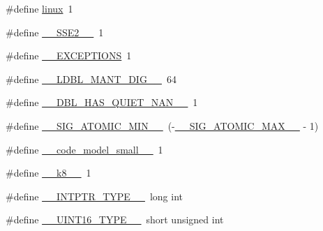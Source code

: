 \begin{DoxyCompactItemize}
\item 
\#define \hyperlink{build-analizer__host-_desktop___qt__5__9__0___g_c_c__64bit-_release_2moc__predefs_8h_aa092b0d4c1d4d4407b97024f6cb2820c}{linux}~1
\item 
\#define \hyperlink{build-analizer__host-_desktop___qt__5__9__0___g_c_c__64bit-_release_2moc__predefs_8h_a88cd3f961f8705563745c43024377efa}{\+\_\+\+\_\+\+S\+S\+E2\+\_\+\+\_\+}~1
\item 
\#define \hyperlink{build-analizer__host-_desktop___qt__5__9__0___g_c_c__64bit-_release_2moc__predefs_8h_a260281f3f3cd1c287fce0d5bb737febb}{\+\_\+\+\_\+\+E\+X\+C\+E\+P\+T\+I\+O\+N\+S}~1
\item 
\#define \hyperlink{build-analizer__host-_desktop___qt__5__9__0___g_c_c__64bit-_release_2moc__predefs_8h_a3c8df97b7413f417379377b604d060f5}{\+\_\+\+\_\+\+L\+D\+B\+L\+\_\+\+M\+A\+N\+T\+\_\+\+D\+I\+G\+\_\+\+\_\+}~64
\item 
\#define \hyperlink{build-analizer__host-_desktop___qt__5__9__0___g_c_c__64bit-_release_2moc__predefs_8h_a5e816b71154141be2784accabcdc0ead}{\+\_\+\+\_\+\+D\+B\+L\+\_\+\+H\+A\+S\+\_\+\+Q\+U\+I\+E\+T\+\_\+\+N\+A\+N\+\_\+\+\_\+}~1
\item 
\#define \hyperlink{build-analizer__host-_desktop___qt__5__9__0___g_c_c__64bit-_release_2moc__predefs_8h_aa39266a3f430ebcd4a4374e7a815e23f}{\+\_\+\+\_\+\+S\+I\+G\+\_\+\+A\+T\+O\+M\+I\+C\+\_\+\+M\+I\+N\+\_\+\+\_\+}~(-\/\hyperlink{build-analizer__host-_desktop___qt__5__9__0___g_c_c__64bit-_release_2moc__predefs_8h_a9e75b72378b039587e4fc4006776826d}{\+\_\+\+\_\+\+S\+I\+G\+\_\+\+A\+T\+O\+M\+I\+C\+\_\+\+M\+A\+X\+\_\+\+\_\+} -\/ 1)
\item 
\#define \hyperlink{build-analizer__host-_desktop___qt__5__9__0___g_c_c__64bit-_release_2moc__predefs_8h_ac045b6c5c8c7e9a0208818a2c0b4b2c2}{\+\_\+\+\_\+code\+\_\+model\+\_\+small\+\_\+\+\_\+}~1
\item 
\#define \hyperlink{build-analizer__host-_desktop___qt__5__9__0___g_c_c__64bit-_release_2moc__predefs_8h_a3ee6b6578d683a0e44bc3b4d2a7425e4}{\+\_\+\+\_\+k8\+\_\+\+\_\+}~1
\item 
\#define \hyperlink{build-analizer__host-_desktop___qt__5__9__0___g_c_c__64bit-_release_2moc__predefs_8h_a4ca36196b9f45fa67a0b23c43c658aa1}{\+\_\+\+\_\+\+I\+N\+T\+P\+T\+R\+\_\+\+T\+Y\+P\+E\+\_\+\+\_\+}~long int
\item 
\#define \hyperlink{build-analizer__host-_desktop___qt__5__9__0___g_c_c__64bit-_release_2moc__predefs_8h_a4c0e7daf2ae663a4f96693468bbb279f}{\+\_\+\+\_\+\+U\+I\+N\+T16\+\_\+\+T\+Y\+P\+E\+\_\+\+\_\+}~short unsigned int

\end{DoxyCompactItemize}
